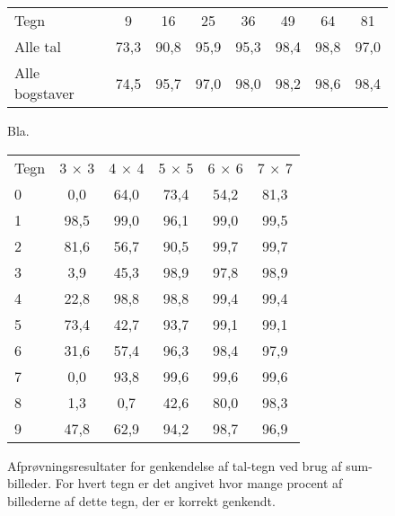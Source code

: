 \begin{figure}[htp]
\centering
\begin{tabular}{|l|c|c|c|c|c|c|c|}\hline
\rowcolor[gray]{0.9} \multicolumn{8}{|>{\columncolor[gray]{0.9}}c|}{\textbf{Middelvektor}} \\ \hline
Tegn & 9 & 16 & 25 & 36 & 49 & 64 & 81\\\hline
Alle tal & 73,3 & 90,8 & 95,9 & 95,3 & 98,4 & 98,8 & 97,0\\\hline
Alle bogstaver & 74,5 & 95,7 & 97,0 & 98,0 & 98,2 & 98,6 & 98,4\\\hline
\end{tabular}
\caption{Bla.}
\label{fig:test:middel_alletegn}
\end{figure}

\begin{figure}[htp]
\centering
\begin{tabular}{|l|c|c|c|c|c|}\hline
\rowcolor[gray]{0.9} \multicolumn{6}{|>{\columncolor[gray]{0.9}}c|}{\textbf{Sum-billeder}} \\ \hline
Tegn & 3 $\times$ 3 & 4 $\times$ 4 & 5 $\times$ 5 & 6 $\times$ 6 & 7 $\times$ 7\\\hline
0 & 0,0 & 64,0 & 73,4 & 54,2 & 81,3\\\hline
1 & 98,5  & 99,0 & 96,1 & 99,0 & 99,5\\\hline
2 & 81,6 & 56,7 & 90,5 & 99,7 & 99,7\\\hline
3 & 3,9 & 45,3 & 98,9 & 97,8 & 98,9\\\hline
4 & 22,8 & 98,8 & 98,8 & 99,4 & 99,4\\\hline
5 & 73,4 & 42,7 & 93,7 & 99,1 & 99,1\\\hline
6 & 31,6 & 57,4 & 96,3 & 98,4 & 97,9\\\hline
7 & 0,0 & 93,8 & 99,6 & 99,6 & 99,6\\\hline
8 & 1,3 & 0,7 & 42,6 & 80,0 & 98,3\\\hline
9 & 47,8 & 62,9 & 94,2 & 98,7 & 96,9\\\hline
\end{tabular}
\caption{Afprøvningsresultater for genkendelse af tal-tegn ved brug af sum-billeder. For hvert tegn er det angivet hvor mange procent af billederne af dette tegn, der er korrekt genkendt.}
\label{fig:test:sum_tal}
\end{figure}

